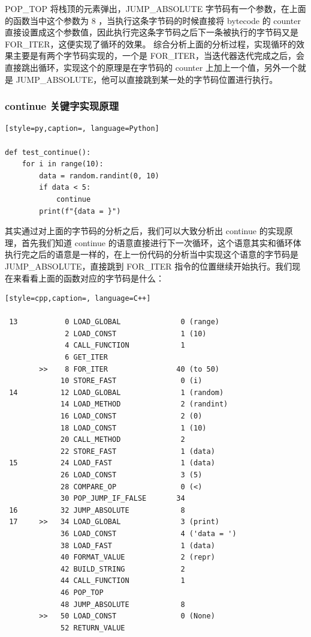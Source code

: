 POP\_TOP 将栈顶的元素弹出，JUMP\_ABSOLUTE 字节码有一个参数，在上面的函数当中这个参数为 8 ，当执行这条字节码的时候直接将 bytecode 的 counter 直接设置成这个参数值，因此执行完这条字节码之后下一条被执行的字节码又是 FOR\_ITER，这便实现了循环的效果。
综合分析上面的分析过程，实现循环的效果主要是有两个字节码实现的，一个是 FOR\_ITER，当迭代器迭代完成之后，会直接跳出循环，实现这个的原理是在字节码的 counter 上加上一个值，另外一个就是 JUMP\_ABSOLUTE，他可以直接跳到某一处的字节码位置进行执行。
\subsubsection{continue 关键字实现原理}
\begin{lstlisting}[style=py,caption=, language=Python]

def test_continue():
    for i in range(10):
        data = random.randint(0, 10)
        if data < 5:
            continue
        print(f"{data = }")
\end{lstlisting}
其实通过对上面的字节码的分析之后，我们可以大致分析出 continue 的实现原理，首先我们知道 continue 的语意直接进行下一次循环，这个语意其实和循环体执行完之后的语意是一样的，在上一份代码的分析当中实现这个语意的字节码是 JUMP\_ABSOLUTE，直接跳到 FOR\_ITER 指令的位置继续开始执行。我们现在来看看上面的函数对应的字节码是什么：
\begin{lstlisting}[style=cpp,caption=, language=C++]

 13           0 LOAD_GLOBAL              0 (range)
              2 LOAD_CONST               1 (10)
              4 CALL_FUNCTION            1
              6 GET_ITER
        >>    8 FOR_ITER                40 (to 50)
             10 STORE_FAST               0 (i)
 14          12 LOAD_GLOBAL              1 (random)
             14 LOAD_METHOD              2 (randint)
             16 LOAD_CONST               2 (0)
             18 LOAD_CONST               1 (10)
             20 CALL_METHOD              2
             22 STORE_FAST               1 (data)
 15          24 LOAD_FAST                1 (data)
             26 LOAD_CONST               3 (5)
             28 COMPARE_OP               0 (<)
             30 POP_JUMP_IF_FALSE       34
 16          32 JUMP_ABSOLUTE            8
 17     >>   34 LOAD_GLOBAL              3 (print)
             36 LOAD_CONST               4 ('data = ')
             38 LOAD_FAST                1 (data)
             40 FORMAT_VALUE             2 (repr)
             42 BUILD_STRING             2
             44 CALL_FUNCTION            1
             46 POP_TOP
             48 JUMP_ABSOLUTE            8
        >>   50 LOAD_CONST               0 (None)
             52 RETURN_VALUE
\end{lstlisting}
